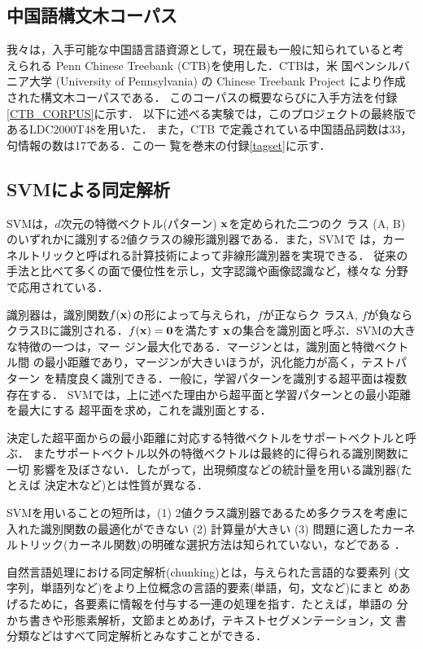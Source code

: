 \subsection{中国語構文木コーパス}
\label{節:CTB}

我々は，入手可能な中国語言語資源として，現在最も一般に知られていると考
えられる Penn Chinese Treebank (CTB)を使用した．CTBは，米
国ペンシルバニア大学 (University of Pennsylvania) の Chinese Treebank
Project により作成された構文木コーパスである．
このコーパスの概要ならびに入手方法を付録\ref{CTB_CORPUS}に示す．
以下に述べる実験では，このプロジェクトの最終版であるLDC2000T48を用いた．
また，CTB で定義されている中国語品詞数は33，句情報の数は17である．この一
覧を巻末の付録\ref{tagset}に示す．


\subsection{SVMによる同定解析}
\label{節:YamCha}

SVMは，$d$次元の特徴ベクトル(パターン) $\bf{x}$を定められた二つのク
ラス (A, B) のいずれかに識別する2値クラスの線形識別器である．また，SVMで
は，カーネルトリックと呼ばれる計算技術によって非線形識別器を実現できる．
従来の手法と比べて多くの面で優位性を示し，文字認識や画像認識など，様々な
分野で応用されている．

識別器は，識別関数$f(\bf{x})$の形によって与えられ，$f$が正ならク
ラスA, $f$が負ならクラスBに識別される．$f(\bf{x})=0$を満たす
$\bf{x}$の集合を識別面と呼ぶ．SVMの大きな特徴の一つは，マー
ジン最大化である．マージンとは，識別面と特徴ベクトル間
の最小距離であり，マージンが大きいほうが，汎化能力が高く，テストパターン
を精度良く識別できる．一般に，学習パターンを識別する超平面は複数存在する．
SVMでは，上に述べた理由から超平面と学習パターンとの最小距離を最大にする
超平面を求め，これを識別面とする．

決定した超平面からの最小距離に対応する特徴ベクトルをサポートベクトルと呼ぶ．
またサポートベクトル以外の特徴ベクトルは最終的に得られる識別関数に一切
影響を及ぼさない．したがって，出現頻度などの統計量を用いる識別器(たとえば
決定木など)とは性質が異なる．

SVMを用いることの短所は，(1) 2値クラス識別器であるため多クラスを考慮に
入れた識別関数の最適化ができない (2) 計算量が大きい (3) 問題に適したカーネ
ルトリック(カーネル関数)の明確な選択方法は知られていない，などである
\cite{Maeda2001}．

自然言語処理における同定解析(chunking)とは，与えられた言語的な要素列
(文字列，単語列など)をより上位概念の言語的要素(単語，句，文など)にまと
めあげるために，各要素に情報を付与する一連の処理を指す．たとえば，単語の
分かち書きや形態素解析，文節まとめあげ，テキストセグメンテーション，文
書分類などはすべて同定解析とみなすことができる．

